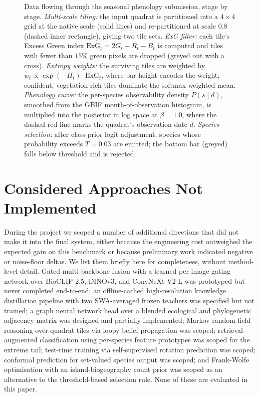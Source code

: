 \begin{figure}[!ht]
  \centering
  \resizebox{\linewidth}{!}{}
  \caption{Data flowing through the seasonal phenology submission, stage by stage. \textit{Multi-scale tiling:} the input quadrat is partitioned into a $4{\times}4$ grid at the native scale (solid lines) and re-partitioned at scale $0.8$ (dashed inner rectangle), giving two tile sets. \textit{ExG filter:} each tile's Excess Green index $\mathrm{ExG}_t = 2G_t - R_t - B_t$ is computed and tiles with fewer than $15\%$ green pixels are dropped (greyed out with a cross). \textit{Entropy weights:} the surviving tiles are weighted by $w_t \propto \exp(-H_t)\cdot\mathrm{ExG}_t$, where bar height encodes the weight; confident, vegetation-rich tiles dominate the softmax-weighted mean. \textit{Phenology curve:} the per-species observability density $P(s\mid d)$, smoothed from the GBIF month-of-observation histogram, is multiplied into the posterior in log space at $\beta{=}1.0$, where the dashed red line marks the quadrat's observation date $d$. \textit{Species selection:} after class-prior logit adjustment, species whose probability exceeds $T{=}0.03$ are emitted; the bottom bar (greyed) falls below threshold and is rejected.}
  \label{fig:phenology_illustration}
\end{figure}

\section{Considered Approaches Not Implemented}
\label{sec:not_implemented}

During the project we scoped a number of additional directions that did not make it into the
final system, either because the engineering cost outweighed the expected gain on this
benchmark or because preliminary work indicated negative or noise-floor deltas. We list them
briefly here for completeness, without method-level detail. Gated multi-backbone fusion with a
learned per-image gating network over BioCLIP 2.5, DINOv3, and ConvNeXt-V2-L was prototyped but
never completed end-to-end; an offline-cached high-resolution knowledge distillation pipeline with
two SWA-averaged frozen teachers was specified but not trained; a graph neural network head over a
blended ecological and phylogenetic adjacency matrix was designed and partially implemented; Markov
random field reasoning over quadrat tiles via loopy belief propagation was scoped;
retrieval-augmented classification using per-species feature prototypes was scoped for the extreme
tail; test-time training via self-supervised rotation prediction was scoped; conformal prediction
for set-valued species output was scoped; and Frank-Wolfe optimisation with an island-biogeography
count prior was scoped as an alternative to the threshold-based selection rule. None of these are
evaluated in this paper.

